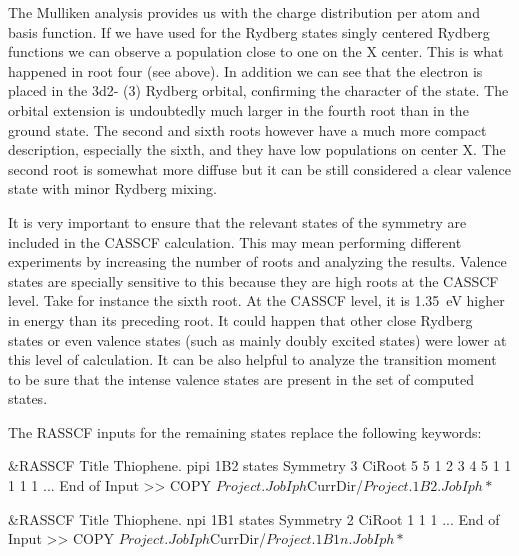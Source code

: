 The Mulliken analysis provides us with the charge distribution per atom
and basis function. If we have used for the Rydberg states singly centered 
Rydberg functions we can observe a population close to one on the X center.
This is what happened in root four (see above). In addition we can see that
the electron is placed in the 3d2- (3\dxy) Rydberg orbital, confirming the
character of the state. The orbital extension is undoubtedly much larger
in the fourth root than in the ground state. The second and sixth roots however have 
a much more compact description, especially the sixth, and they have low populations
on center X. The second root is somewhat more diffuse but it can be still considered
a clear valence state with minor Rydberg mixing.


It is very important to ensure that 
the relevant states of the symmetry are included in the CASSCF calculation. This
may mean performing different experiments by increasing the number of roots
and analyzing the results. Valence states are specially sensitive to this
because they are high roots at the CASSCF level. Take for instance
the sixth root. At the CASSCF level, it is 1.35~eV higher in energy than its 
preceding root. It could happen that other close Rydberg states or even
valence states (such as mainly doubly excited states) were lower at this
level of calculation. It can be also helpful to analyze the transition moment
to be sure that the intense valence states are present in the set of computed
states.

The RASSCF inputs for the remaining states replace the following keywords:

\begin{inputlisting}
 &RASSCF
Title                                                                           
 Thiophene. pipi  1B2 states
Symmetry                                                                        
    3                                                                          
CiRoot                                                                        
5 5                                                                           
1 2 3 4 5
1 1 1 1 1
...
End of Input                                                                    
>> COPY $Project.JobIph $CurrDir/$Project.1B2.JobIph
*$
\end{inputlisting}

\begin{inputlisting}
 &RASSCF
Title                                                                           
 Thiophene. npi  1B1 states
Symmetry                                                                        
    2                                                                          
CiRoot                                                                        
1 1                                                                           
1 
...
End of Input                                                                    
>> COPY $Project.JobIph $CurrDir/$Project.1B1n.JobIph
*$
\end{inputlisting}

